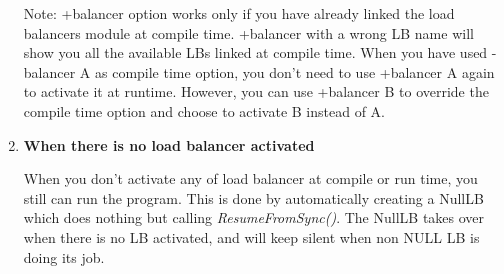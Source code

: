 \begin{enumerate}
Note: +balancer option works only if you have already linked the load balancers module at compile time. +balancer with a 
wrong LB name will show you all the available LBs linked at compile time.
When you have used -balancer A as compile time option, you don't need to use 
+balancer A again to activate it at runtime. However, you can 
use +balancer B to override the compile time option and choose to
activate B instead of A.

\item {\bf When there is no load balancer activated}

When you don't activate any of load balancer at compile or run time, you still 
can run the program. This is done by automatically creating a NullLB which 
does nothing but calling {\em ResumeFromSync()}. 
The NullLB takes over when there is no LB activated, and will keep silent 
when non NULL LB is doing its job. 

\end{enumerate}

